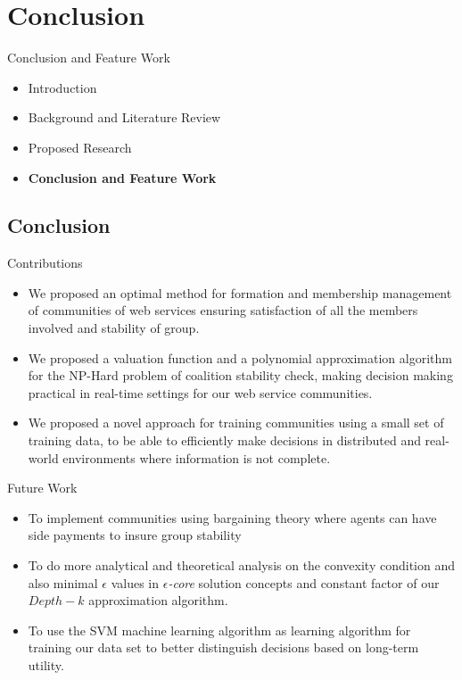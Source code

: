 \documentclass{beamer}
\begin{document}
\section{Conclusion}
\begin{frame}{Conclusion and Feature Work}
    \begin{itemize}
     	\itemsep=.5cm
    	\item Introduction
    	\item Background and Literature Review
    	\item Proposed Research
    	\item {\bf Conclusion and Feature Work}
    \end{itemize}
\end{frame}

\subsection{Conclusion}
\begin{frame}{Contributions}
    \begin{itemize}     	
        	\item We proposed an optimal method for formation and membership management of communities of web services ensuring satisfaction of all the members involved and stability of group.
        	\item We proposed a valuation function and a polynomial approximation algorithm for the NP-Hard problem of coalition stability check, making decision making practical in real-time settings for our web service communities.
        	\item We proposed a novel approach for training communities using a small set of training data, to be able to efficiently make decisions in distributed and real-world environments where information is not complete.
    \end{itemize}
\end{frame}

\begin{frame}{Future Work}
    \begin{itemize}     	
    	\item To implement communities using bargaining theory where agents can have side payments to insure group stability
    	\item To do more analytical and theoretical analysis on the convexity condition and also minimal $\epsilon$ values in \emph{$\epsilon$-core} solution concepts and constant factor  of our $Depth-k$ approximation algorithm.
    	\item To use the SVM machine learning algorithm as learning algorithm for training our data set to better distinguish decisions based on long-term utility.
    \end{itemize}
\end{frame}
\end{document}
